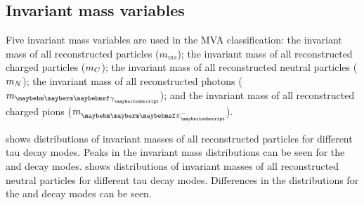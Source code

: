 
\subsection{Invariant mass variables}

Five invariant mass variables are used in the MVA classification: the invariant mass of all reconstructed particles ($m_{vis}$); the invariant mass of all reconstructed charged particles ($m_{C}$); the invariant mass of all reconstructed neutral particles ($m_{N}$); the invariant mass of all reconstructed photons ($m_{\Pgg}$); and the invariant mass of all reconstructed  charged pions ($m_{\Pgpm}$).

 shows distributions of invariant masses of all reconstructed particles  for different tau decay modes. Peaks in the invariant mass distributions can be seen for the \Prho and \Pai decay modes.  shows distributions of invariant masses of all reconstructed neutral particles  for different tau decay modes. Differences in the distributions for  the \Prho and \Pai decay modes can be seen.






